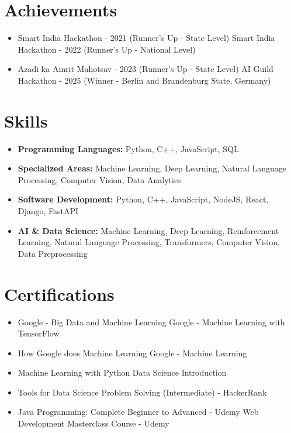 \documentclass[a4paper,10pt]{article}
\begin{document}
\section*{Achievements}
\begin{itemize}
\item Smart India Hackathon - 2021 (Runner's Up - State Level) \hfill Smart India Hackathon - 2022 (Runner's Up - National Level)
\item Azadi ka Amrit Mahotsav - 2023 (Runner's Up - State Level) \hfill AI Guild Hackathon - 2025 (Winner - Berlin and Brandenburg State, Germany)
\end{itemize}

\section*{Skills}
\begin{itemize}
  \item \textbf{Programming Languages:} Python, C++, JavaScript, SQL
  \item \textbf{Specialized Areas:} Machine Learning, Deep Learning, Natural Language Processing, Computer Vision, Data Analytics
  \item \textbf{Software Development:} Python, C++, JavaScript, NodeJS, React, Django, FastAPI
  \item \textbf{AI \& Data Science:} Machine Learning, Deep Learning, Reinforcement Learning, Natural Language Processing, Transformers, Computer Vision, Data Preprocessing
\end{itemize}

\section*{Certifications}
\begin{itemize}
\item Google - Big Data and Machine Learning \hfill Google - Machine Learning with TensorFlow
\item How Google does Machine Learning \hfill Google - Machine Learning
\item Machine Learning with Python \hfill Data Science Introduction
\item Tools for Data Science \hfill Problem Solving (Intermediate) - HackerRank
\item Java Programming: Complete Beginner to Advanced - Udemy \hfill Web Development Masterclass Course - Udemy
\end{itemize}
\end{document}
